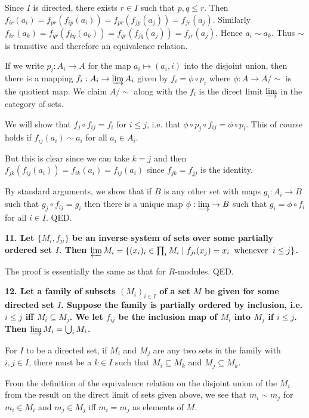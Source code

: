 \documentclass[12pt]{article}
\begin{document}
Since $I$ is directed, there exists $r \in I$ such that $p, q \leq r$. Then $f_{ir}(a_i) = f_{pr}(f_{ip}(a_i)) = f_{pr}(f_{jp}(a_j)) = f_{jr}(a_j)$. Similarly $f_{kr}(a_k) = f_{qr}(f_{kq}(a_k)) = f_{qr}(f_{jq}(a_j)) = f_{jr}(a_j)$. Hence $a_i \sim a_k$. Thus $\sim$ is transitive and therefore an equivalence relation.

If we write $p_i : A_i \to A$ for the map $a_i \mapsto (a_i, i)$ into the disjoint union, then there is a mapping $f_i : A_i \to \varinjlim A_i$ given by $f_i = \phi\circ p_i$ where $\phi : A \to A/\sim$ is the quotient map. We claim $A/\sim$ along with the $f_i$ is the direct limit $\varinjlim$ in the category of sets. 

We will show that $f_j\circ f_{ij} = f_i$ for $i \leq j$, i.e. that $\phi\circ p_j\circ f_{ij} = \phi\circ p_i$. This of course holds if $f_{ij}(a_i) \sim a_i$ for all $a_i \in A_i$.

But this is clear since we can take $k = j$ and then $f_{jk}(f_{ij}(a_i)) = f_{ik}(a_i) = f_{ij}(a_i)$ since $f_{jk} = f_{jj}$ is the identity.

By standard arguments, we show that if $B$ is any other set with maps $g_i : A_i \to B$ such that $g_j\circ f_{ij} = g_i$ then there is a unique map $\phi : \varinjlim \to B$ such that $g_i = \phi\circ f_i$ for all $i \in I$. QED.

\textbf{11. Let $\{M_i, f_{ji}\}$ be an inverse system of sets over some partially ordered set $I$. Then $\varprojlim M_i = \{(x_i)_i \in \prod_i M_i \;|\; f_{ji}(x_j) = x_i \;\;\mbox{whenever}\;\; i \leq j\}$.}

The proof is essentially the same as that for $R$-modules. QED.

\textbf{12. Let a family of subsets $(M_i)_{i\in I}$ of a set $M$ be given for some directed set $I$. Suppose the family is  partially ordered by inclusion, i.e. $i \leq j$ iff $M_i \subseteq M_j$. We let $f_{ij}$ be the inclusion map of $M_i$ into $M_j$ if $i \leq j$. Then $\varinjlim M_i = \bigcup_i M_i$.}

For $I$ to be a directed set, if $M_i$ and $M_j$ are any two sets in the family with $i, j \in I$, there must be a $k \in I$ such that $M_i \subseteq M_k$ and $M_j \subseteq M_k$.

From the definition of the equivalence relation on the disjoint union of the $M_i$ from the result on the direct limit of sets given above, we see that $m_i \sim m_j$ for $m_i \in M_i$ and $m_j \in M_j$ iff $m_i = m_j$ as elements of $M$.
\end{document}
